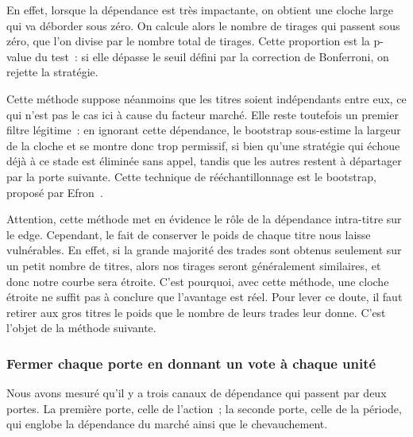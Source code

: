 En effet, lorsque la dépendance est très impactante, on obtient une cloche
large qui va déborder sous zéro. On calcule alors le nombre de tirages qui
passent sous zéro, que l'on divise par le nombre total de tirages. Cette
proportion est la p-value du test~: si elle dépasse le seuil défini par la
correction de Bonferroni, on rejette la stratégie.

Cette méthode suppose néanmoins que les titres soient indépendants entre
eux, ce qui n'est pas le cas ici à cause du facteur marché. Elle reste
toutefois un premier filtre légitime~: en ignorant cette dépendance, le
bootstrap sous-estime la largeur de la cloche et se montre donc trop
permissif, si bien qu'une stratégie qui échoue déjà à ce stade est éliminée
sans appel, tandis que les autres restent à départager par la porte suivante.
Cette technique de rééchantillonnage est le bootstrap, proposé par
Efron~\cite{efron1979}.

Attention, cette méthode met en évidence le rôle de la dépendance intra-titre
sur le edge. Cependant, le fait de conserver le poids de chaque titre nous laisse
vulnérables. En effet, si la grande majorité des trades sont obtenus seulement sur
un petit nombre de titres, alors nos tirages seront généralement similaires,
et donc notre courbe sera étroite.
C'est pourquoi, avec cette méthode, une cloche étroite ne suffit pas à
conclure que l'avantage est réel.
Pour lever ce doute, il faut retirer aux gros titres le poids que le nombre
de leurs trades leur donne. C'est l'objet de la méthode suivante.

\subsubsection*{Fermer chaque porte en donnant un vote à chaque unité}

Nous avons mesuré qu'il y a trois canaux de dépendance qui passent par deux portes.
La première porte, celle de l'action~; la seconde porte, celle de la période, qui
englobe la dépendance du marché ainsi que le chevauchement.

